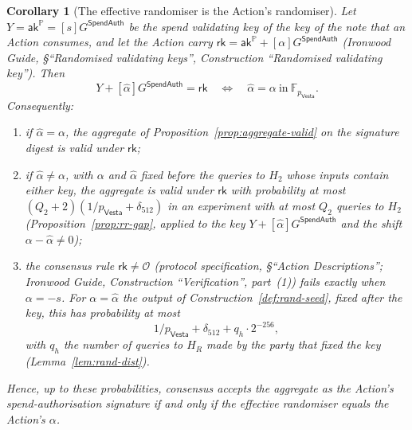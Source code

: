 \documentclass[11pt,a4paper]{article}
\newtheorem{corollary}[theorem]{Corollary}
\theoremstyle{definition}
\newcommand{\F}{\mathbb{F}}
\newcommand{\PP}{\mathbb{P}}
\newcommand{\rk}{\mathsf{rk}}
\newcommand{\Vesta}{\ensuremath{\mathsf{Vesta}}}
\newcommand{\aksym}{\ensuremath{\mathsf{ak}}}
\begin{document}
\begin{corollary}[The effective randomiser is the Action's randomiser]
\label{cor:alpha}
Let \(Y = \aksym^{\PP} = [s]G^{\mathsf{SpendAuth}}\) be the spend
validating key of the key of the note that an Action consumes, and let the
Action carry
\(\rk = \aksym^{\PP} + [\alpha]G^{\mathsf{SpendAuth}}\) (\emph{Ironwood
Guide}, \S``Randomised validating keys'', Construction ``Randomised validating
key''). Then
\[
  Y + [\hat{\alpha}]G^{\mathsf{SpendAuth}} = \rk
  \quad\Longleftrightarrow\quad
  \hat{\alpha} = \alpha \ \text{in}\ \F_{p_{\Vesta}} .
\]
Consequently:
\begin{enumerate}
\item[(i)] if \(\hat{\alpha} = \alpha\), the aggregate of
  Proposition~\ref{prop:aggregate-valid} on the signature digest is valid
  under \(\rk\);
\item[(ii)] if \(\hat{\alpha} \ne \alpha\), with \(\alpha\) and
  \(\hat{\alpha}\) fixed before the queries to \(H_2\) whose inputs contain
  either key, the aggregate is valid under \(\rk\) with probability at most
  \((Q_2 + 2)(1/p_{\Vesta} + \delta_{512})\) in an experiment with at most
  \(Q_2\) queries to \(H_2\) (Proposition~\ref{prop:rr-gap}, applied to the
  key \(Y + [\hat{\alpha}]G^{\mathsf{SpendAuth}}\) and the shift
  \(\alpha - \hat{\alpha} \ne 0\));
\item[(iii)] the consensus rule \(\rk \ne \mathcal{O}\) (protocol
  specification, \S``Action Descriptions''; \emph{Ironwood Guide},
  Construction ``Verification'', part~(1)) fails exactly when
  \(\alpha = -s\). For \(\alpha = \hat{\alpha}\) the output of
  Construction~\ref{def:rand-seed}, fixed after the key, this has
  probability at most
  \[
    1/p_{\Vesta} + \delta_{512} + q_h \cdot 2^{-256} ,
  \]
  with \(q_h\) the number of queries to \(H_R\) made by the party that
  fixed the key (Lemma~\ref{lem:rand-dist}).
\end{enumerate}
Hence, up to these probabilities, consensus accepts the aggregate as the
Action's spend-authorisation signature if and only if the effective
randomiser equals the Action's \(\alpha\).
\end{corollary}
\end{document}
